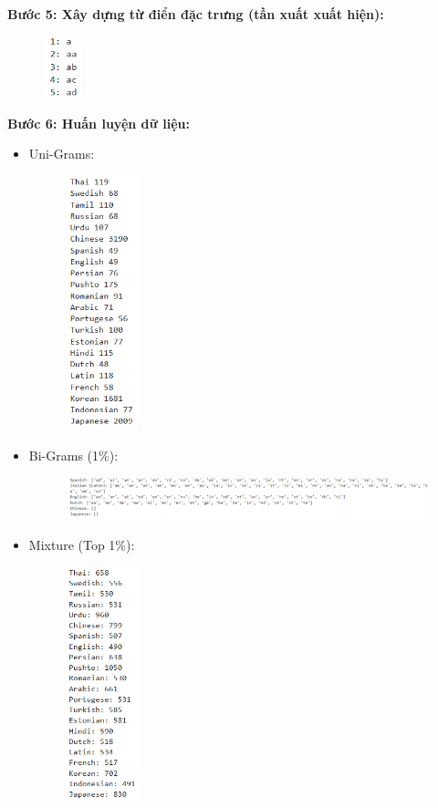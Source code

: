 \textbf{Bước 5: Xây dựng từ điển đặc trưng (tần xuất xuất hiện):}
\begin{figure}[H]
    \centering
    \includegraphics[width=0.1\textwidth]{img/docspics/Picture8.png}
\end{figure}
\clearpage
\textbf{Bước 6: Huấn luyện dữ liệu:}
\begin{itemize}
    \item Uni-Grams:
    \begin{figure}[H]
    \centering
    \includegraphics[width=0.2\textwidth]{img/docspics/Picture9.png}
\end{figure}
    \item Bi-Grams (1\%):
    \begin{figure}[H]
    \centering
    \includegraphics[width=1\textwidth]{img/docspics/Picture12.png}
\end{figure}
\clearpage
    \item Mixture (Top 1\%):
    \begin{figure}[H]
    \centering
    \includegraphics[width=0.2\textwidth]{img/docspics/Picture13.png}

\end{figure}
\end{itemize}
